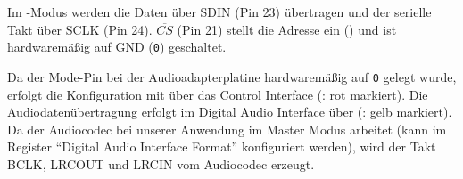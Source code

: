 
Im \IIC{}-Modus werden die Daten über SDIN (Pin 23) übertragen und der serielle Takt über SCLK (Pin 24). $\overline{CS}$ (Pin 21) stellt die Adresse ein () und ist hardwaremäßig auf GND (\texttt{0}) geschaltet.



Da der Mode-Pin bei der Audioadapterplatine hardwaremäßig auf \texttt{0} gelegt wurde, erfolgt die Konfiguration mit \IIC{} über das Control Interface (: rot markiert). Die Audiodatenübertragung erfolgt im Digital Audio Interface über \IIS{} (: gelb markiert). Da der Audiocodec bei unserer Anwendung im Master Modus arbeitet (kann im Register \enquote{Digital Audio Interface Format} konfiguriert werden), wird der Takt BCLK, LRCOUT und LRCIN vom Audiocodec erzeugt.


